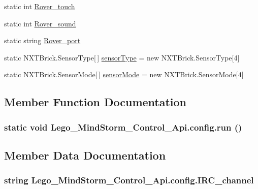 \begin{CompactItemize}
\item 
static int \hyperlink{class_lego___mind_storm___control___api_1_1config_2bacca2facc53e6166e2eeb660124f37}{Rover\_\-touch}
\item 
static int \hyperlink{class_lego___mind_storm___control___api_1_1config_daf30d6facd40697f6784cd56faedfbb}{Rover\_\-sound}
\item 
static string \hyperlink{class_lego___mind_storm___control___api_1_1config_102ebf38643e4211bacaf22c65ee0aeb}{Rover\_\-port}
\item 
static NXTBrick.SensorType\mbox{[}$\,$\mbox{]} \hyperlink{class_lego___mind_storm___control___api_1_1config_66977ca07b5d4efab19da1e89ee8a51c}{sensorType} = new NXTBrick.SensorType\mbox{[}4\mbox{]}
\item 
static NXTBrick.SensorMode\mbox{[}$\,$\mbox{]} \hyperlink{class_lego___mind_storm___control___api_1_1config_7549849a8de7eab30f658950819e6535}{sensorMode} = new NXTBrick.SensorMode\mbox{[}4\mbox{]}
\end{CompactItemize}


\subsection{Member Function Documentation}
\hypertarget{class_lego___mind_storm___control___api_1_1config_951058cc9f3239469c02a597fcaabbc1}{
\subsubsection[{run}]{\setlength{\rightskip}{0pt plus 5cm}static void Lego\_\-MindStorm\_\-Control\_\-Api.config.run ()}}
\label{class_lego___mind_storm___control___api_1_1config_951058cc9f3239469c02a597fcaabbc1}




\subsection{Member Data Documentation}
\hypertarget{class_lego___mind_storm___control___api_1_1config_e7c7ff8462db05e82ac4a83677d97b56}{
\subsubsection[{IRC\_\-channel}]{\setlength{\rightskip}{0pt plus 5cm}string {\bf Lego\_\-MindStorm\_\-Control\_\-Api.config.IRC\_\-channel}}}
\label{class_lego___mind_storm___control___api_1_1config_e7c7ff8462db05e82ac4a83677d97b56}


